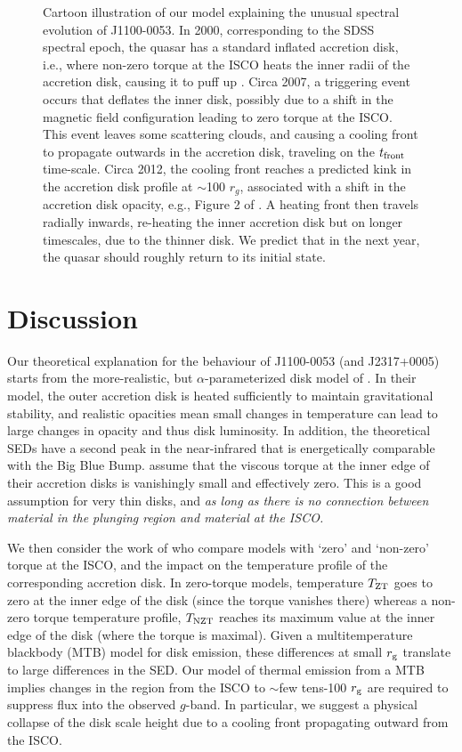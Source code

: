 \documentclass{nature}
\begin{document}
\begin{figure}
{    Cartoon illustration of our model explaining the unusual spectral evolution of J1100-0053. In 2000, corresponding to the SDSS spectral epoch, the quasar has a standard inflated accretion disk, i.e., where non-zero torque at the ISCO heats the inner radii of the accretion disk, causing it to puff up \citep[e.g.,][]{Zimmerman2005}. Circa 2007, a triggering event occurs that deflates the inner disk, possibly due to a shift in the magnetic field configuration leading to zero torque at the ISCO.  This event leaves some scattering clouds, and causing a cooling front to propagate outwards in the accretion disk, traveling on the $t_{\rm front}$ time-scale. Circa 2012, the cooling front reaches a predicted kink in the accretion disk profile at $\sim$100 $r_{g}$, associated with a shift in the accretion disk opacity, e.g., Figure 2 of \cite{Sirko_Goodman2003}. A heating front then travels radially inwards, re-heating the inner accretion disk but on longer timescales, due to the thinner disk. We predict that in the next year, the quasar should roughly return to its initial state.}
  \label{fig:J110057_diskmodel}
\end{figure}

\section{Discussion} 
Our theoretical explanation for the behaviour of J1100-0053 (and
J2317+0005) starts from the more-realistic, but $\alpha$-parameterized
disk model of \cite{Sirko_Goodman2003}. In their model, 
the outer accretion disk is heated sufficiently to
maintain gravitational stability, and realistic opacities mean small
changes in temperature can lead to large changes in opacity and thus disk luminosity. 
In addition, the theoretical SEDs have a second peak
in the near-infrared that is energetically comparable with the Big
Blue Bump. 
\cite{Sirko_Goodman2003} assume
that the viscous torque at the inner edge of their accretion
disks is vanishingly small and effectively zero. This is a good
assumption for very thin disks, and
\emph{as long as there is no connection between material in the plunging
region and material at the ISCO.}

We then consider the work of
\cite{Zimmerman2005} who compare models with `zero' and `non-zero'
torque at the ISCO,
and the impact on the temperature profile of the corresponding accretion disk.
In zero-torque models, temperature $T_{\rm ZT}$ goes to zero at
the inner edge of the disk (since the torque vanishes there) whereas
a non-zero torque temperature profile, $T_{\rm NZT}$ reaches its
maximum value at the inner edge of the disk (where the torque is maximal).
Given a multitemperature blackbody (MTB) model for disk emission,
these differences
at small $r_{\rm g}$ translate to large differences in the SED. 
Our model of thermal emission from a MTB implies changes in the
region from the ISCO to $\sim$few tens-100 $r_{\rm g}$ are required to
suppress flux into the observed $g$-band. In particular, we suggest a
physical collapse of the disk scale height due to a cooling front
propagating outward from the ISCO.
\end{document}
